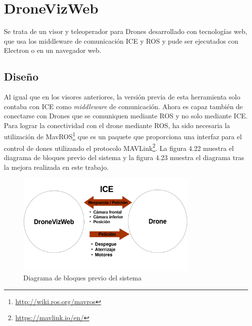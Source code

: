 \section{DroneVizWeb}
Se trata de un visor y teleoperador para Drones desarrollado con tecnologías web, que usa los middleware de comunicación ICE y ROS y pude ser ejecutados con Electron o en un navegador web.

\subsection{Diseño}
Al igual que en los visores anteriores, la versión previa de esta herramienta solo contaba con ICE como \textit{middleware} de comunicación. Ahora es capaz también de conectarse con Drones que se comuniquen mediante ROS y no solo mediante ICE. Para lograr la conectividad con el drone mediante ROS, ha sido necesaria la utilización de MavROS\footnote{\url{http://wiki.ros.org/mavros}} que es un paquete que proporciona una interfaz para el control de dones utilizando el protocolo MAVLink\footnote{\url{https://mavlink.io/en/}}. La figura 4.22 muestra el diagrama de bloques previo del sistema y la figura 4.23 muestra el diagrama tras la mejora realizada en este trabajo.

\begin{figure}[H]
  \begin{center}
    \includegraphics[width=0.8\textwidth]{figures/DroneViz1.png}
		\caption{Diagrama de bloques previo del sistema}
		\label{fig.esquematurtlebot1}
		\end{center}
\end{figure}

